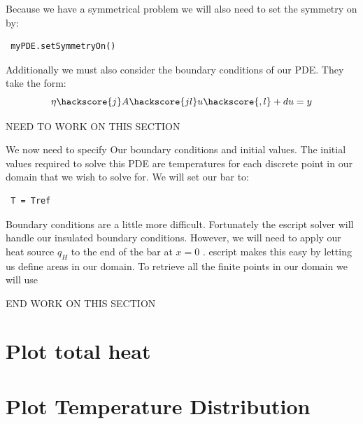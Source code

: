 Because we have a symmetrical problem we will also need to set the symmetry on by:
\begin{verbatim}
 myPDE.setSymmetryOn()
\end{verbatim}

Additionally we must also consider the boundary conditions of our PDE. They take the form:
\begin{equation}
\eta \hackscore{j} A\hackscore{jl} u\hackscore{,l} + du = y
\end{equation}


NEED TO WORK ON THIS SECTION

We now need to specify Our boundary conditions and initial values. The initial values required to solve this PDE are temperatures for each discrete point in our domain that we wish to solve for. We will set our bar to:
\begin{verbatim}
 T = Tref
\end{verbatim}
Boundary conditions are a little more difficult. Fortunately the escript solver will handle our insulated boundary conditions. However, we will need to apply our heat source $q_{H}$ to the end of the bar at $x=0$ . escript makes this easy by letting us define areas in our domain. To retrieve all the finite points in our domain we will use 

END WORK ON THIS SECTION

\section{Plot total heat} 


\section{Plot Temperature Distribution}

 
